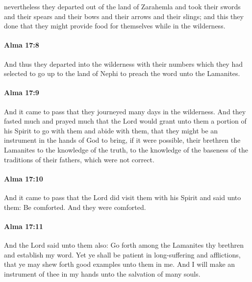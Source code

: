 			nevertheless they departed out of the land of Zarahemla
			and took their swords and their spears
			and their bows and their arrows and their slings;
			and this they done that they might provide food for themselves
			while in the wilderness.

		\paragraph{Alma 17:8} %
			\label{ALMA-17-8}

			And thus they departed into the wilderness
			with their numbers which they had selected
			to go up to the land of Nephi to preach the word unto the Lamanites.

		\paragraph{Alma 17:9} %
			\label{ALMA-17-9}

			And it came to pass that they journeyed many days in the wilderness.
			And they fasted much and prayed much
			that the Lord would grant unto them a portion of his Spirit
			to go with them and abide with them,
			that they might be an instrument in the hands of God
			to bring, if it were possible, their brethren the Lamanites
			to the knowledge of the truth,
			to the knowledge of the baseness of the traditions of their fathers,
			which were not correct.

		\paragraph{Alma 17:10} %
			\label{ALMA-17-10}

			And it came to pass that
			the Lord did visit them with his Spirit
			and said unto them: Be comforted.
			And they were comforted.

		\paragraph{Alma 17:11} %
			\label{ALMA-17-11}

			And the Lord said unto them also:
			Go forth among the Lamanites thy brethren and establish my word.
			Yet ye shall be patient in long-suffering and afflictions,
			that ye may shew forth good examples unto them in me.
			And I will make an instrument of thee in my hands
			unto the salvation of many souls.

